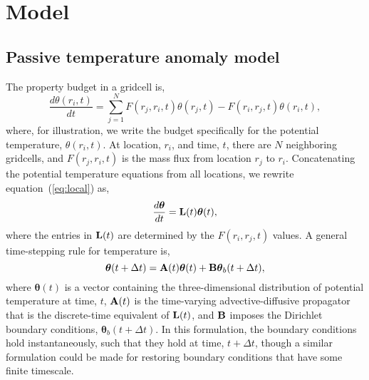 \documentclass[12pt]{article}
\begin{document}
\section{Model}

\subsection{Passive temperature anomaly model}

The property budget in a gridcell is,
\begin{equation}
\label{eq:local}
\frac{d\theta(r_i,t)}{dt} = \sum_{j=1}^N F(r_j,r_i,t)\theta(r_j,t) -F(r_i,r_j,t)\theta(r_i,t),
\end{equation}
where, for illustration, we write the budget specifically for the
potential temperature, $\theta(r_i,t)$.  At location, $r_i$, and time,
$t$, there are $N$ neighboring gridcells, and $F(r_j,r_i,t)$ is the
mass flux from location $r_j$ to $r_i$.  Concatenating the potential
temperature equations from all locations, we rewrite
equation~(\ref{eq:local}) as,
\begin{equation}
\label{eq:tendency1}
\frac{d{\boldsymbol \theta}}{dt} = {\bf L}(t) {\boldsymbol \theta}(t),
\end{equation}
where the entries in ${\bf L}(t)$ are determined by the $F(r_i,r_j,t)$ values. A general time-stepping rule for temperature is,
\begin{equation}
\label{eq:timestepping}
{\boldsymbol \theta}(t+ \Delta t) = {\bf A}(t) {\boldsymbol \theta}(t) + {\bf B} {\boldsymbol \theta}_{b}(t+\Delta t), 
\end{equation}
where ${\boldsymbol \theta}(t)$ is a vector containing the
three-dimensional distribution of potential temperature at time, $t$,
${\bf A}(t)$ is the time-varying advective-diffusive propagator that
is the discrete-time equivalent of ${\bf L}(t)$, and ${\bf B}$ imposes
the Dirichlet boundary conditions,
${\boldsymbol \theta}_{b}(t+\Delta t)$. In this formulation, the
boundary conditions hold instantaneously, such that they hold at time,
$t+{\Delta}t$, though a similar formulation could be made for
restoring boundary conditions that have some finite timescale.
\end{document}
